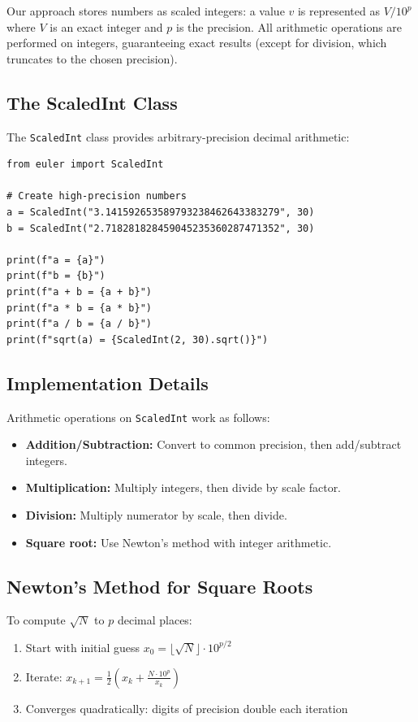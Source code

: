 Our approach stores numbers as scaled integers: a value $v$ is represented as
$V / 10^p$ where $V$ is an exact integer and $p$ is the precision. All arithmetic
operations are performed on integers, guaranteeing exact results (except for division,
which truncates to the chosen precision).

\subsection{The ScaledInt Class}

The \texttt{ScaledInt} class provides arbitrary-precision decimal arithmetic:

\begin{lstlisting}[caption={Basic high-precision arithmetic}, label=lst:hp_basic]
from euler import ScaledInt

# Create high-precision numbers
a = ScaledInt("3.141592653589793238462643383279", 30)
b = ScaledInt("2.718281828459045235360287471352", 30)

print(f"a = {a}")
print(f"b = {b}")
print(f"a + b = {a + b}")
print(f"a * b = {a * b}")
print(f"a / b = {a / b}")
print(f"sqrt(a) = {ScaledInt(2, 30).sqrt()}")
\end{lstlisting}

\subsection{Implementation Details}

Arithmetic operations on \texttt{ScaledInt} work as follows:
\begin{itemize}
    \item \textbf{Addition/Subtraction:} Convert to common precision, then add/subtract integers.
    \item \textbf{Multiplication:} Multiply integers, then divide by scale factor.
    \item \textbf{Division:} Multiply numerator by scale, then divide.
    \item \textbf{Square root:} Use Newton's method with integer arithmetic.
\end{itemize}

\subsection{Newton's Method for Square Roots}

To compute $\sqrt{N}$ to $p$ decimal places:
\begin{enumerate}
\item Start with initial guess $x_0 = \lfloor \sqrt{N} \rfloor \cdot 10^{p/2}$
\item Iterate: $x_{k+1} = \frac{1}{2}\left(x_k + \frac{N \cdot 10^p}{x_k}\right)$
\item Converges quadratically: digits of precision double each iteration
\end{enumerate}

